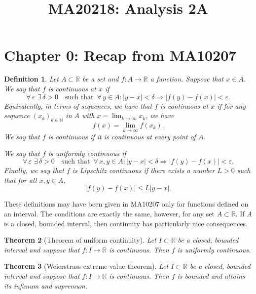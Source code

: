 \documentclass[a4paper,reqno]{amsart}
\numberwithin{equation}{section}
\newtheorem{definition}{Definition}[section]
\newtheorem{theorem}[definition]{Theorem}
\def\N{\mathbb{N}}
\def\R{\mathbb{R}}
\begin{document}
\title[MA20218: Analysis 2A]{MA20218: Analysis 2A}
\maketitle

\section*{Chapter 0: Recap from MA10207}

\begin{definition} Let $A\subset \R$ be a set and $f : A \to \R$ a function. Suppose that $x \in A$. We say that $f$ is continuous at $x$ if
$$
\forall\, \varepsilon \,\, \exists\, \delta>0 \quad \textrm{such that } \, \forall \, y\in A:  |y - x| < \delta \Rightarrow |f (y) - f (x)| < \varepsilon.
$$
Equivalently, in terms of sequences, we have that $f$ is continuous at $x$ if for any sequence $(x_k)_{k\in \N}$ in $A$ with $x=\lim_{k\to \infty} x_k$, we have  
$$
f(x)=\lim_{k\to \infty} f(x_k).
$$
We say that $f$ is continuous if it is continuous at every point of $A$. 

We say that $f$ is uniformly continuous if
$$
\forall\, \varepsilon \,\, \exists\, \delta>0 \quad \textrm{such that } \, \forall \, x, y\in A:  |y - x| < \delta \Rightarrow |f (y) - f (x)| < \varepsilon.
$$
Finally, we say that $f$ is Lipschitz continuous if there exists a number $L > 0$ such that for all $x,y \in A$,
$$
|f(y) - f(x)| \le L |y - x|.
$$
\end{definition}

These definitions may have been given in MA10207 only for functions defined on an interval. The conditions are exactly the same, however, for any set $A\subset \R$. If $A$ is a closed, bounded interval, then continuity has particularly nice consequences.

\begin{theorem}[Theorem of uniform continuity] 
Let $I \subset \R$ be a closed, bounded interval and suppose that $f : I \to \R$ is continuous. Then $f$ is uniformly continuous.
\end{theorem}

\begin{theorem}[Weierstrass extreme value theorem]
Let $I \subset \R$ be a closed, bounded interval and suppose that $f : I \to \R$ is continuous. Then $f$ is bounded and attains its infimum and supremum.
\end{theorem}


\newpage
\end{document}
